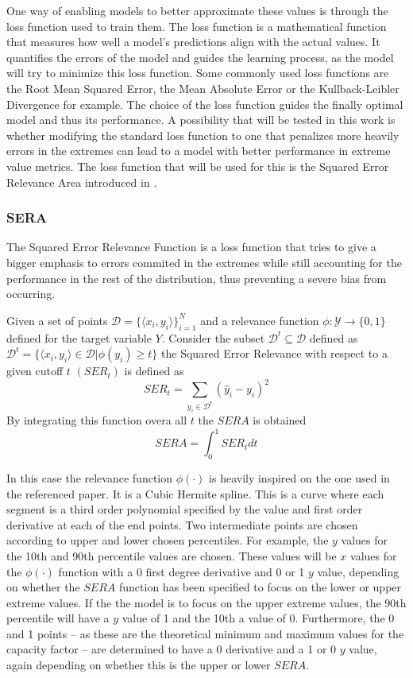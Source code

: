 One way of enabling models to better approximate these values is through the loss function used to train them. The loss function is a mathematical function that measures how well a model's predictions align with the actual values. It quantifies the errors of the model and guides the learning process, as the model will try to minimize this loss function. Some commonly used loss functions are the Root Mean Squared Error, the Mean Absolute Error or the Kullback-Leibler Divergence for example. The choice of the loss function guides the finally optimal model and thus its performance. A possibility that will be tested in this work is whether modifying the standard loss function to one that penalizes more heavily errors in the extremes can lead to a model with better performance in extreme value metrics. The loss function that will be used for this is the Squared Error Relevance Area introduced in \cite{silva_ribeiro_moniz_2022}.
\subsubsection{SERA}
The Squared Error Relevance Function is a loss function that tries to give a bigger emphasis to errors commited in the extremes while still accounting for the performance in the rest of the distribution, thus preventing a severe bias from occurring. 

Given a set of points $\mathcal{D}=\{\langle x_i,y_i\rangle\}^N_{i=1}$ and a relevance function $\phi :\mathcal{Y} \rightarrow \{0,1\}$ defined for the target variable $Y$. Consider the subset $\mathcal{D}^t\subseteq \mathcal{D}$ defined as $\mathcal{D}^t=\{\langle x_i, y_i\rangle \in \mathcal{D} | \phi(y_i)\geq t\}$ the Squared Error Relevance with respect to a given cutoff $t$ $(SER_t)$ is defined as 
\begin{equation}
    SER_t=\sum_{y_i \in \mathcal{D}^t}(\hat{y}_i-y_i)^2
\end{equation}
By integrating this function overa all $t$ the $SERA$ is obtained
\begin{equation}
    SERA=\int_0^1 SER_t dt
\end{equation}

In this case the relevance function $\phi(\cdot)$ is heavily inspired on the one used in the referenced paper. It is a Cubic Hermite spline. This is a curve where each segment is a third order polynomial specified by the value and first order derivative at each of the end points. Two intermediate points are chosen according to upper and lower chosen percentiles. For example, the $y$ values for the 10th and 90th percentile values are chosen. These values will be $x$ values for the $\phi(\cdot)$ function with a 0 first degree derivative and 0 or 1 $y$ value, depending on whether the $SERA$ function has been specified to focus on the lower or upper extreme values. If the the model is to focus on the upper extreme values, the 90th percentile will have a $y$ value of 1 and the 10th a value of 0. Furthermore, the 0 and 1 points -- as these are the theoretical minimum and maximum values for the capacity factor -- are determined to have a 0 derivative and a 1 or 0 $y$ value, again depending on whether this is the upper or lower $SERA$. 
